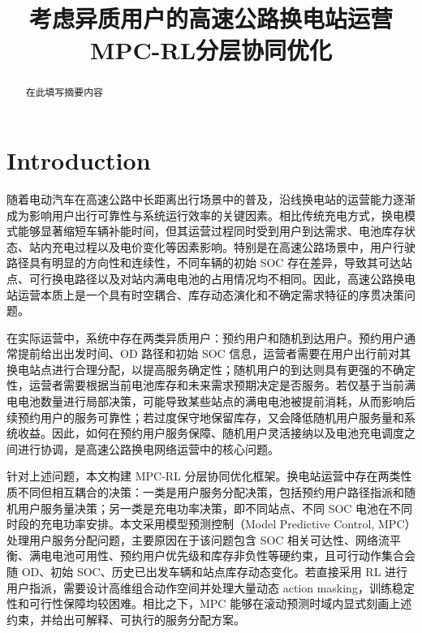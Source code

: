 \documentclass[12pt,hyperref,a4paper,UTF8]{ctexart}
\begin{document}
\cover

\newpage
\begin{abstract}

在此填写摘要内容

\end{abstract}
\newpage

\thispagestyle{empty} %

\newpage
\tableofcontents

\newpage

\begin{center}
   \title{ \Huge \textbf{{考虑异质用户的高速公路换电站运营MPC-RL分层协同优化}}}
\end{center}



\section{Introduction}
随着电动汽车在高速公路中长距离出行场景中的普及，沿线换电站的运营能力逐渐成为影响用户出行可靠性与系统运行效率的关键因素。相比传统充电方式，换电模式能够显著缩短车辆补能时间，但其运营过程同时受到用户到达需求、电池库存状态、站内充电过程以及电价变化等因素影响。特别是在高速公路场景中，用户行驶路径具有明显的方向性和连续性，不同车辆的初始 SOC 存在差异，导致其可达站点、可行换电路径以及对站内满电电池的占用情况均不相同。因此，高速公路换电站运营本质上是一个具有时空耦合、库存动态演化和不确定需求特征的序贯决策问题。

在实际运营中，系统中存在两类异质用户：预约用户和随机到达用户。预约用户通常提前给出出发时间、OD 路径和初始 SOC 信息，运营者需要在用户出行前对其换电站点进行合理分配，以提高服务确定性；随机用户的到达则具有更强的不确定性，运营者需要根据当前电池库存和未来需求预期决定是否服务。若仅基于当前满电电池数量进行局部决策，可能导致某些站点的满电电池被提前消耗，从而影响后续预约用户的服务可靠性；若过度保守地保留库存，又会降低随机用户服务量和系统收益。因此，如何在预约用户服务保障、随机用户灵活接纳以及电池充电调度之间进行协调，是高速公路换电网络运营中的核心问题。

针对上述问题，本文构建 MPC-RL 分层协同优化框架。换电站运营中存在两类性质不同但相互耦合的决策：一类是用户服务分配决策，包括预约用户路径指派和随机用户服务量决策；另一类是充电功率决策，即不同站点、不同 SOC 电池在不同时段的充电功率安排。本文采用模型预测控制（Model Predictive Control, MPC）处理用户服务分配问题，主要原因在于该问题包含 SOC 相关可达性、网络流平衡、满电电池可用性、预约用户优先级和库存非负性等硬约束，且可行动作集合会随 OD、初始 SOC、历史已出发车辆和站点库存动态变化。若直接采用 RL 进行用户指派，需要设计高维组合动作空间并处理大量动态 action masking，训练稳定性和可行性保障均较困难。相比之下，MPC 能够在滚动预测时域内显式刻画上述约束，并给出可解释、可执行的服务分配方案。
\end{document}
